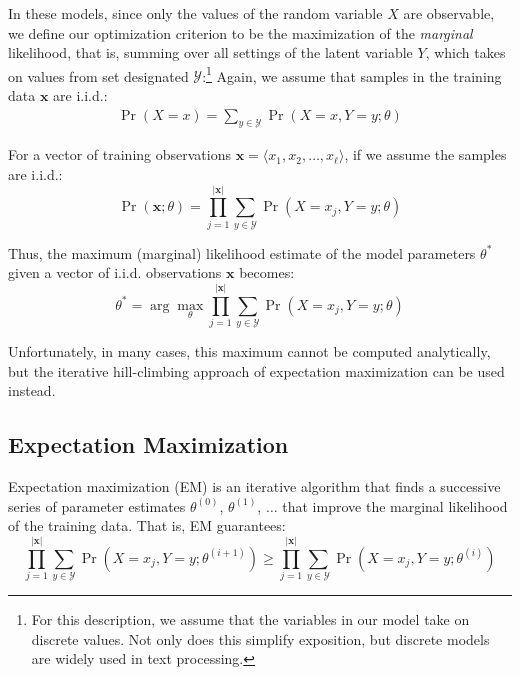 In these models, since only the values of the random variable $X$ are
observable, we define our optimization criterion to be the
maximization of the \emph{marginal} likelihood, that is, summing over
all settings of the latent variable $Y$, which takes on values from
set designated $\mathcal{Y}$:\footnote{For this description, we assume
  that the variables in our model take on discrete values.  Not only
  does this simplify exposition, but discrete models are widely used
  in text processing.} Again, we assume that samples in the training
data $\textbf{x}$ are i.i.d.:
\begin{align}
\Pr(X=x) = \sum_{y \in \mathcal{Y}} \Pr(X=x,Y=y ; \theta)
\end{align}

\noindent For a vector of training observations $\textbf{x} = \langle
x_1,x_2, \ldots, x_{\ell} \rangle $, if we assume the samples are
i.i.d.:
\begin{equation}
\Pr(\textbf{x};\theta) = \prod_{j=1}^{|\textbf{x}|} \sum_{y \in \mathcal{Y}} \Pr(X=x_j,Y=y ; \theta)
\end{equation}

\noindent Thus, the maximum (marginal) likelihood estimate of the
model parameters $\theta^*$ given a vector of i.i.d. observations
$\textbf{x}$ becomes:
\begin{equation}
\theta^* = \arg \max_{\theta} \prod_{j=1}^{|\textbf{x}|} \sum_{y \in \mathcal{Y}} \Pr(X=x_j,Y=y ; \theta)
\end{equation}

\noindent Unfortunately, in many cases, this maximum cannot be
computed analytically, but the iterative hill-climbing approach of
expectation maximization can be used instead.

\subsection{Expectation Maximization}

Expectation maximization (EM) is an iterative algorithm that finds a
successive series of parameter estimates $\theta^{(0)}$,
$\theta^{(1)}$, $\ldots$ that improve the marginal likelihood of the
training data.  That is, EM guarantees:
\begin{equation}
\prod_{j=1}^{|\textbf{x}|} \sum_{y \in \mathcal{Y}} \Pr(X=x_j,Y=y ; \theta^{(i+1)}) \ge \prod_{j=1}^{|\textbf{x}|} \sum_{y \in \mathcal{Y}} \Pr(X=x_j,Y=y ; \theta^{(i)})
\end{equation}

